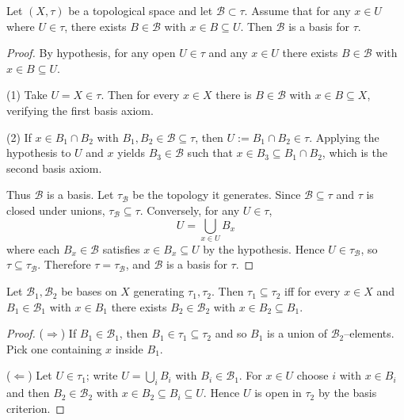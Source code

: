 \begin{proposition}
Let $(X,{\tau})$ be a topological space and let $\mathcal{B}\subset {\tau}$. Assume that for any $x\in U$ where $U\in {\tau}$, there exists $B\in\mathcal{B}$ with $x\in B\subseteq U$. Then $\mathcal{B}$ is a basis for ${\tau}$.
\end{proposition}
\begin{proof}
By hypothesis, for any open $U\in\tau$ and any $x\in U$ there exists $B\in\mathcal{B}$ with $x\in B\subseteq U$.

(1) Take $U=X\in\tau$. Then for every $x\in X$ there is $B\in\mathcal{B}$ with $x\in B\subseteq X$, verifying the first basis axiom.

(2) If $x\in B_1\cap B_2$ with $B_1,B_2\in\mathcal{B}\subseteq\tau$, then $U:=B_1\cap B_2\in\tau$. Applying the hypothesis to $U$ and $x$ yields $B_3\in\mathcal{B}$ such that $x\in B_3\subseteq B_1\cap B_2$, which is the second basis axiom.

Thus $\mathcal{B}$ is a basis. Let $\tau_{\mathcal{B}}$ be the topology it generates. Since $\mathcal{B}\subseteq\tau$ and $\tau$ is closed under unions, $\tau_{\mathcal{B}}\subseteq\tau$. Conversely, for any $U\in\tau$,
\[
U=\bigcup_{x\in U} B_x
\]
where each $B_x\in\mathcal{B}$ satisfies $x\in B_x\subseteq U$ by the hypothesis. Hence $U\in\tau_{\mathcal{B}}$, so $\tau\subseteq\tau_{\mathcal{B}}$. Therefore $\tau=\tau_{\mathcal{B}}$, and $\mathcal{B}$ is a basis for $\tau$.
\end{proof}

\begin{proposition}
Let $\mathcal{B}_1,\mathcal{B}_2$ be bases on $X$ generating ${\tau}_1,{\tau}_2$. Then ${\tau}_1\subseteq{\tau}_2$ iff for every $x\in X$ and $B_1\in\mathcal{B}_1$ with $x\in B_1$ there exists $B_2\in\mathcal{B}_2$ with $x\in B_2\subseteq B_1$.
\end{proposition}
\begin{proof}
($\Rightarrow$) If $B_1\in\mathcal{B}_1$, then $B_1\in{\tau}_1\subseteq{\tau}_2$ and so $B_1$ is a union of $\mathcal{B}_2$–elements. Pick one containing $x$ inside $B_1$.

($\Leftarrow$) Let $U\in{\tau}_1$; write $U=\bigcup_{i} B_i$ with $B_i\in\mathcal{B}_1$. For $x\in U$ choose $i$ with $x\in B_i$ and then $B_2\in\mathcal{B}_2$ with $x\in B_2\subseteq B_i\subseteq U$. Hence $U$ is open in ${\tau}_2$ by the basis criterion.
\end{proof}

